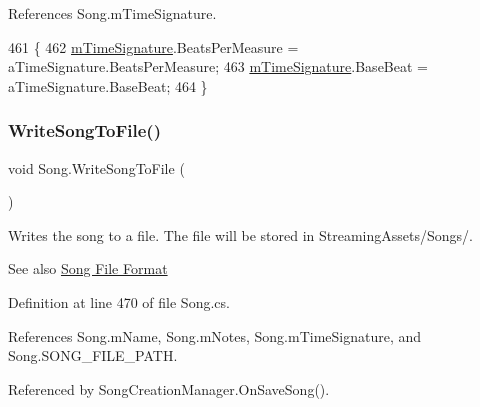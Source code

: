 References Song.\+m\+Time\+Signature.


\begin{DoxyCode}
461     \{
462         \hyperlink{group___song_priv_var_ga2b2dcc0e83e49f7303b6a1371877b25e}{mTimeSignature}.BeatsPerMeasure = aTimeSignature.BeatsPerMeasure;
463         \hyperlink{group___song_priv_var_ga2b2dcc0e83e49f7303b6a1371877b25e}{mTimeSignature}.BaseBeat = aTimeSignature.BaseBeat;
464     \}
\end{DoxyCode}
\mbox{\label{group___song_pub_func_ga70b0f6021c3b0590c561a88e3d1e5c2f}} 
\subsubsection{\texorpdfstring{Write\+Song\+To\+File()}{WriteSongToFile()}}
{\footnotesize\ttfamily void Song.\+Write\+Song\+To\+File (\begin{DoxyParamCaption}{ }\end{DoxyParamCaption})}



Writes the song to a file. The file will be stored in Streaming\+Assets/\+Songs/. 

\begin{DoxySeeAlso}{See also}
\hyperlink{group___song_group_DocSongFileFormat}{Song File Format} 
\end{DoxySeeAlso}


Definition at line 470 of file Song.\+cs.



References Song.\+m\+Name, Song.\+m\+Notes, Song.\+m\+Time\+Signature, and Song.\+S\+O\+N\+G\+\_\+\+F\+I\+L\+E\+\_\+\+P\+A\+TH.



Referenced by Song\+Creation\+Manager.\+On\+Save\+Song().


